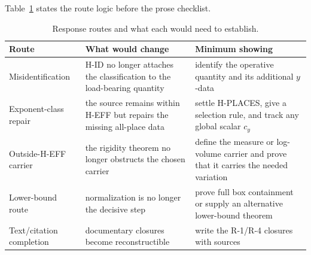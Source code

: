 \documentclass[11pt,a4paper]{article}
\theoremstyle{definition}
\theoremstyle{remark}
\begin{document}
Table~\ref{tab:response-routes} states the route logic before the prose
checklist.

\begin{table}[htbp]
\centering
\small
\caption{Response routes and what each would need to establish.}
\label{tab:response-routes}
\begin{tabularx}{\textwidth}{@{}>{\raggedright\arraybackslash}p{} >{\raggedright\arraybackslash}p{} >{\raggedright\arraybackslash}X@{}}
\toprule
Route & What would change & Minimum showing \\
\midrule
Misidentification & H-ID no longer attaches the classification to the
load-bearing quantity & identify the operative quantity and its additional
$y$-data \\
Exponent-class repair & the source remains within H-EFF but repairs the
missing all-place data & settle H-PLACES, give a selection rule, and track
any global scalar $c_y$ \\
Outside-H-EFF carrier & the rigidity theorem no longer obstructs the chosen
carrier & define the measure or log-volume carrier and prove that it carries
the needed variation \\
Lower-bound route & normalization is no longer the decisive step & prove
full box containment or supply an alternative lower-bound theorem \\
Text/citation completion & documentary closures become reconstructible &
write the R-1/R-4 closures with sources \\
\bottomrule
\end{tabularx}
\end{table}
\end{document}
